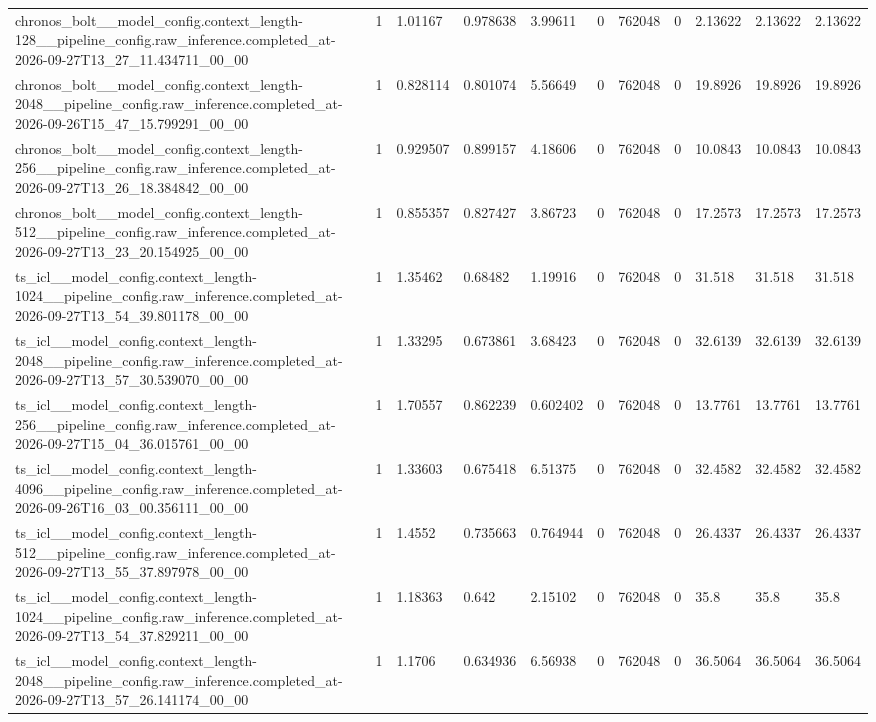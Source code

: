 \begin{tabular}{lllllllllll}
chronos\_bolt\_\_model\_config.context\_length-128\_\_pipeline\_config.raw\_inference.completed\_at-2026-09-27T13\_27\_11.434711\_00\_00 & 1 & 1.01167 & 0.978638 & 3.99611 & 0 & 762048 & 0 & 2.13622 & 2.13622 & 2.13622 \\
chronos\_bolt\_\_model\_config.context\_length-2048\_\_pipeline\_config.raw\_inference.completed\_at-2026-09-26T15\_47\_15.799291\_00\_00 & 1 & 0.828114 & 0.801074 & 5.56649 & 0 & 762048 & 0 & 19.8926 & 19.8926 & 19.8926 \\
chronos\_bolt\_\_model\_config.context\_length-256\_\_pipeline\_config.raw\_inference.completed\_at-2026-09-27T13\_26\_18.384842\_00\_00 & 1 & 0.929507 & 0.899157 & 4.18606 & 0 & 762048 & 0 & 10.0843 & 10.0843 & 10.0843 \\
chronos\_bolt\_\_model\_config.context\_length-512\_\_pipeline\_config.raw\_inference.completed\_at-2026-09-27T13\_23\_20.154925\_00\_00 & 1 & 0.855357 & 0.827427 & 3.86723 & 0 & 762048 & 0 & 17.2573 & 17.2573 & 17.2573 \\
ts\_icl\_\_model\_config.context\_length-1024\_\_pipeline\_config.raw\_inference.completed\_at-2026-09-27T13\_54\_39.801178\_00\_00 & 1 & 1.35462 & 0.68482 & 1.19916 & 0 & 762048 & 0 & 31.518 & 31.518 & 31.518 \\
ts\_icl\_\_model\_config.context\_length-2048\_\_pipeline\_config.raw\_inference.completed\_at-2026-09-27T13\_57\_30.539070\_00\_00 & 1 & 1.33295 & 0.673861 & 3.68423 & 0 & 762048 & 0 & 32.6139 & 32.6139 & 32.6139 \\
ts\_icl\_\_model\_config.context\_length-256\_\_pipeline\_config.raw\_inference.completed\_at-2026-09-27T15\_04\_36.015761\_00\_00 & 1 & 1.70557 & 0.862239 & 0.602402 & 0 & 762048 & 0 & 13.7761 & 13.7761 & 13.7761 \\
ts\_icl\_\_model\_config.context\_length-4096\_\_pipeline\_config.raw\_inference.completed\_at-2026-09-26T16\_03\_00.356111\_00\_00 & 1 & 1.33603 & 0.675418 & 6.51375 & 0 & 762048 & 0 & 32.4582 & 32.4582 & 32.4582 \\
ts\_icl\_\_model\_config.context\_length-512\_\_pipeline\_config.raw\_inference.completed\_at-2026-09-27T13\_55\_37.897978\_00\_00 & 1 & 1.4552 & 0.735663 & 0.764944 & 0 & 762048 & 0 & 26.4337 & 26.4337 & 26.4337 \\
ts\_icl\_\_model\_config.context\_length-1024\_\_pipeline\_config.raw\_inference.completed\_at-2026-09-27T13\_54\_37.829211\_00\_00 & 1 & 1.18363 & 0.642 & 2.15102 & 0 & 762048 & 0 & 35.8 & 35.8 & 35.8 \\
ts\_icl\_\_model\_config.context\_length-2048\_\_pipeline\_config.raw\_inference.completed\_at-2026-09-27T13\_57\_26.141174\_00\_00 & 1 & 1.1706 & 0.634936 & 6.56938 & 0 & 762048 & 0 & 36.5064 & 36.5064 & 36.5064 \\

\end{tabular}
